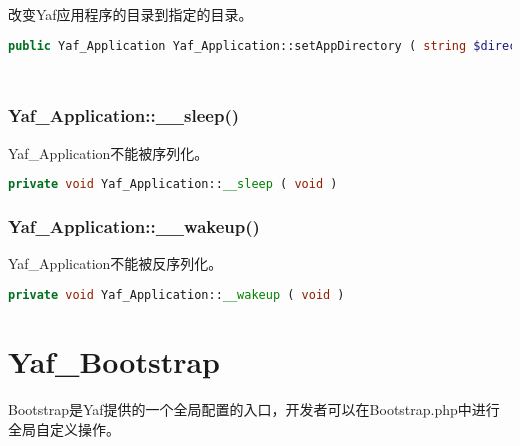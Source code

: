 改变Yaf应用程序的目录到指定的目录。






\begin{lstlisting}[language=PHP]
public Yaf_Application Yaf_Application::setAppDirectory ( string $directory )
\end{lstlisting}



\begin{lstlisting}[language=PHP]

\end{lstlisting}



\begin{lstlisting}[language=PHP]

\end{lstlisting}


\subsection{Yaf\_Application::\_\_sleep()}

Yaf\_Application不能被序列化。






\begin{lstlisting}[language=PHP]
private void Yaf_Application::__sleep ( void )
\end{lstlisting}



\subsection{Yaf\_Application::\_\_wakeup()}

Yaf\_Application不能被反序列化。







\begin{lstlisting}[language=PHP]
private void Yaf_Application::__wakeup ( void )
\end{lstlisting}

\chapter{Yaf\_Bootstrap}

Bootstrap是Yaf提供的一个全局配置的入口，开发者可以在Bootstrap.php中进行全局自定义操作。


